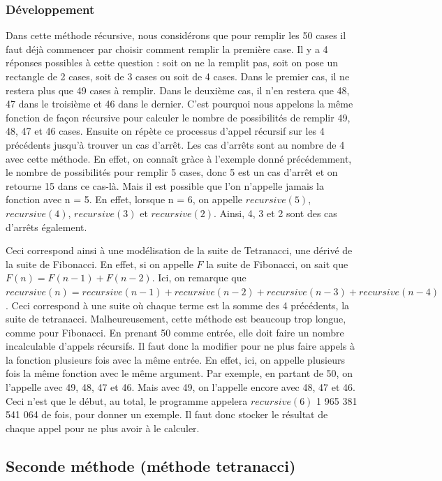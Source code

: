 \documentclass{article}
\begin{document}


\subsubsection{Développement}
Dans cette méthode récursive, nous considérons que pour remplir les 50 cases il faut déjà commencer par choisir comment remplir la première case. Il y a 4 réponses possibles à cette question : soit on ne la remplit pas, soit on pose un rectangle de 2 cases, soit de 3 cases ou soit de 4 cases. Dans le premier cas, il ne restera plus que 49 cases à remplir. Dans le deuxième cas, il n'en restera que 48, 47 dans le troisième et 46 dans le dernier. C'est pourquoi nous appelons la même fonction de façon récursive pour calculer le nombre de possibilités de remplir 49, 48, 47 et 46 cases. Ensuite on répète ce processus d'appel récursif sur les 4 précédents jusqu'à trouver un cas d'arrêt. Les cas d'arrêts sont au nombre de 4 avec cette méthode. En effet, on connaît gràce à l'exemple donné précédemment, le nombre de possibilités pour remplir 5 cases, donc 5 est un cas d'arrêt et on retourne 15 dans ce cas-là. Mais il est possible que l'on n'appelle jamais la fonction avec n = 5. En effet, lorsque n = 6, on appelle $recursive(5)$, $recursive(4)$, $recursive(3)$ et $recursive(2)$. Ainsi, 4, 3 et 2 sont des cas d'arrêts également.

Ceci correspond ainsi à une modélisation de la suite de Tetranacci, une dérivé de la suite de Fibonacci. En effet, si on appelle $F$ la suite de Fibonacci, on sait que $F(n) = F(n-1) + F(n-2)$. Ici, on remarque que $recursive(n) = recursive(n-1) + recursive(n-2) + recursive(n-3) + recursive(n-4)$. Ceci correspond à une suite où chaque terme est la somme des 4 précédents, la suite de tetranacci. Malheureusement, cette méthode est beaucoup trop longue, comme pour Fibonacci. En prenant 50 comme entrée, elle doit faire un nombre incalculable d'appels récursifs. Il faut donc la modifier pour ne plus faire appels à la fonction plusieurs fois avec la même entrée. En effet, ici, on appelle plusieurs fois la même fonction avec le même argument. Par exemple, en partant de 50, on l'appelle avec 49, 48, 47 et 46. Mais avec 49, on l'appelle encore avec 48, 47 et 46. Ceci n'est que le début, au total, le programme appelera $recursive(6)$ 1 965 381 541 064 de fois, pour donner un exemple. Il faut donc stocker le résultat de chaque appel pour ne plus avoir à le calculer.
\subsection{Seconde méthode (méthode tetranacci)}
\end{document}
